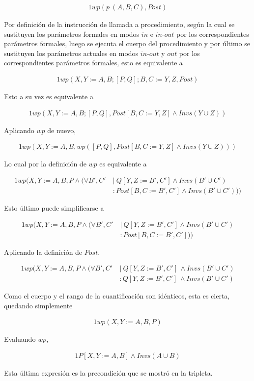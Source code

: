 \begin{alignat}{1}
wp(p\  (A,B,C), Post)
\end{alignat}

Por definición de la instrucción de llamada a procedimiento, según la cual se sustituyen los parámetros formales en modos $in$ e $in\textrm{-}out$ por los correspondientes parámetros formales, luego se ejecuta el
cuerpo del procedimiento y por último se sustituyen los parámetros
actuales en modos $in\textrm{-}out$ y $out$ por los correspondientes parámetros formales, esto es equivalente a

\begin{alignat}{1}
wp(X,Y := A,B; [P,Q]; B,C := Y,Z, Post)
\end{alignat}

Esto a su vez es equivalente a

\begin{alignat}{1}
wp(X,Y := A,B; [P,Q], Post[B,C := Y,Z] \land Invs(Y \cup Z))
\end{alignat}

Aplicando $wp$ de nuevo,

\begin{alignat}{1}
wp(X,Y := A,B, wp([P,Q], Post[B,C := Y,Z] \land Invs(Y \cup Z)))
\end{alignat}

Lo cual por la definición de $wp$ es equivalente a

\begin{alignat}{1}
wp(X,Y := A,B, P \land (\forall B',C'\ &|\ Q [Y,Z := B',C'] \land Invs (B' \cup C') \nonumber \\
                                       &: Post [B,C := B',C'] \land Invs (B' \cup C')))
\end{alignat}

Esto último puede simplificarse a

\begin{alignat}{1}
wp(X,Y := A,B, P \land (\forall B',C'\ &|\ Q [Y,Z := B',C'] \land Invs (B' \cup C') \nonumber \\
                                       &: Post [B,C := B',C']))
\end{alignat}

Aplicando la definición de $Post$,

\begin{alignat}{1}
wp(X,Y := A,B, P \land (\forall B',C'\ &|\ Q [Y,Z := B',C']\, \land Invs (B' \cup C')  \nonumber \\
                                       &:  Q [Y,Z := B',C']\, \land Invs (B' \cup C')
\end{alignat}

Como el cuerpo y el rango de la cuantificación son idénticos, esta es cierta, quedando simplemente

\begin{alignat}{1}
wp(X,Y := A,B, P)
\end{alignat}

Evaluando $wp$,

\begin{alignat}{1}
P[X,Y := A,B] \land Invs (A \cup B)
\end{alignat}

Esta última expresión es la precondición que se mostró en la tripleta.

